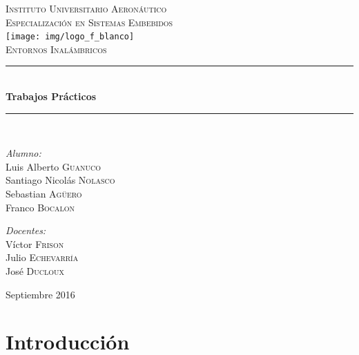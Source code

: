 \documentclass[11pt,oneside,spanish,a4paper]{article}
\newcommand{\HRule}{\rule{\linewidth}{0.5mm}}
\begin{document}

\begin{titlepage}
\begin{center}

\textsc{\LARGE Instituto Universitario Aeronáutico}\\[0.5cm]
\textsc{\LARGE Especialización en Sistemas Embebidos}\\[2cm]

\texttt{[image: img/logo\_f\_blanco]}~\\[2cm]

\textsc{\Large Entornos Inalámbricos}\\[0.5cm]

\HRule \\[0.4cm]
{ \huge \bfseries Trabajos Prácticos \\[0.4cm] }

\HRule \\[1.5cm]

\begin{minipage}{0.4\textwidth}
\begin{flushleft} \large
\emph{Alumno:}\\
Luis Alberto \textsc{Guanuco}\\
Santiago Nicolás \textsc{Nolasco}\\
Sebastian \textsc{Agüero}\\
Franco \textsc{Bocalon}
\end{flushleft}
\end{minipage}
\begin{minipage}{0.4\textwidth}
\begin{flushright} \large
\emph{Docentes:} \\
Víctor \textsc{Frison}\\
Julio \textsc{Echevarría}\\
José \textsc{Ducloux}
\end{flushright}
\end{minipage}
\vfill
{\large Septiembre 2016}

\end{center}
\end{titlepage}


\tableofcontents{}
\section{Introducción}
\label{sec:intro}
\end{document}
